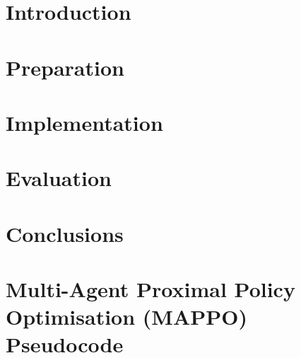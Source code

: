 \documentclass[12pt,a4paper,twoside,openright]{report}
\begin{document}



\chapter{Introduction}


\chapter{Preparation}


\chapter{Implementation}


\chapter{Evaluation}

 
\chapter{Conclusions}



\newpage

\printbibliography


\appendix


\chapter{Multi-Agent Proximal Policy Optimisation (MAPPO) Pseudocode}
\end{document}
